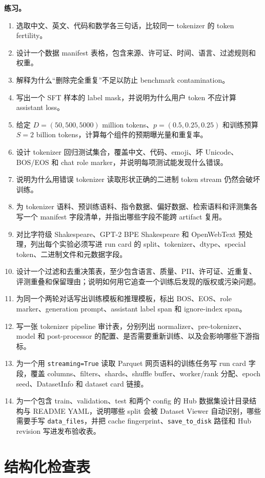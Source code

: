 \documentclass[UTF8,zihao=-4,openany]{ctexbook}
\begin{document}
\textbf{练习。}
\begin{enumerate}
\item 选取中文、英文、代码和数学各三句话，比较同一 tokenizer 的 token fertility。
\item 设计一个数据 manifest 表格，包含来源、许可证、时间、语言、过滤规则和权重。
\item 解释为什么“删除完全重复”不足以防止 benchmark contamination。
\item 写出一个 SFT 样本的 label mask，并说明为什么用户 token 不应计算 assistant loss。
\item 给定 $D=(50,500,5000)$ million tokens、$p=(0.5,0.25,0.25)$ 和训练预算 $S=2$ billion tokens，计算每个组件的预期曝光量和重复率。
\item 设计 tokenizer 回归测试集合，覆盖中文、代码、emoji、坏 Unicode、BOS/EOS 和 chat role marker，并说明每项测试能发现什么错误。
\item 说明为什么用错误 tokenizer 读取形状正确的二进制 token stream 仍然会破坏训练。
\item 为 tokenizer 语料、预训练语料、指令数据、偏好数据、检索语料和评测集各写一个 manifest 字段清单，并指出哪些字段不能跨 artifact 复用。
\item 对比字符级 Shakespeare、GPT-2 BPE Shakespeare 和 OpenWebText 预处理，列出每个实验必须写进 run card 的 split、tokenizer、dtype、special token、二进制文件和元数据字段。
\item 设计一个过滤和去重决策表，至少包含语言、质量、PII、许可证、近重复、评测重叠和保留理由；说明如何用它追查一个训练后发现的版权或污染问题。
\item 为同一个两轮对话写出训练模板和推理模板，标出 BOS、EOS、role marker、generation prompt、assistant label span 和 ignore-index span。
\item 写一张 tokenizer pipeline 审计表，分别列出 normalizer、pre-tokenizer、model 和 post-processor 的配置、是否需要重新训练、以及会影响哪些下游指标。
\item 为一个用 \texttt{streaming=True} 读取 Parquet 网页语料的训练任务写 run card 字段，覆盖 columns、filters、shards、shuffle buffer、worker/rank 分配、epoch seed、DatasetInfo 和 dataset card 链接。
\item 为一个包含 train、validation、test 和两个 config 的 Hub 数据集设计目录结构与 README YAML，说明哪些 split 会被 Dataset Viewer 自动识别，哪些需要手写 \texttt{data\_files}，并把 cache fingerprint、\texttt{save\_to\_disk} 路径和 Hub revision 写进发布验收表。
\end{enumerate}

\section{结构化检查表}
\end{document}
